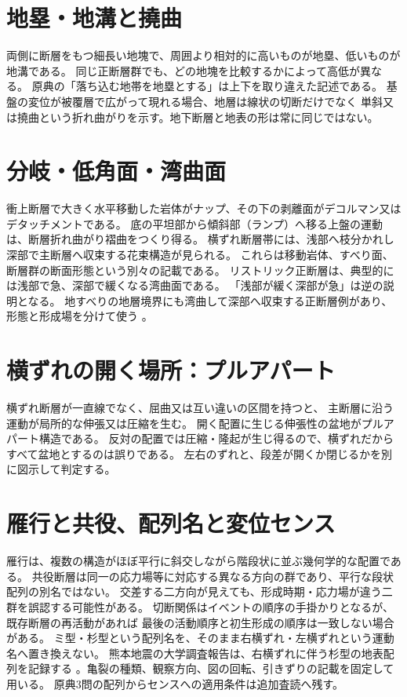 \section{地塁・地溝と撓曲}
\label{theory:structure:horst}
両側に断層をもつ細長い地塊で、周囲より相対的に高いものが地塁、低いものが地溝である。
同じ正断層群でも、どの地塊を比較するかによって高低が異なる。
原典の「落ち込む地帯を地塁とする」は上下を取り違えた記述である。
基盤の変位が被覆層で広がって現れる場合、地層は線状の切断だけでなく
単斜又は撓曲という折れ曲がりを示す。地下断層と地表の形は常に同じではない。

\section{分岐・低角面・湾曲面}
\label{theory:structure:geometry}
衝上断層で大きく水平移動した岩体がナップ、その下の剥離面がデコルマン又はデタッチメントである。
底の平坦部から傾斜部（ランプ）へ移る上盤の運動は、断層折れ曲がり褶曲をつくり得る。
横ずれ断層帯には、浅部へ枝分かれし深部で主断層へ収束する花束構造が見られる。
これらは移動岩体、すべり面、断層群の断面形態という別々の記載である。
リストリック正断層は、典型的には浅部で急、深部で緩くなる湾曲面である。
「浅部が緩く深部が急」は逆の説明となる。
地すべりの地層境界にも湾曲して深部へ収束する正断層例があり、形態と形成場を分けて使う
\cite{str_listric}。

\section{横ずれの開く場所：プルアパート}
\label{theory:structure:pullapart}
横ずれ断層が一直線でなく、屈曲又は互い違いの区間を持つと、
主断層に沿う運動が局所的な伸張又は圧縮を生む。
開く配置に生じる伸張性の盆地がプルアパート構造である。
反対の配置では圧縮・隆起が生じ得るので、横ずれだからすべて盆地とするのは誤りである。
左右のずれと、段差が開くか閉じるかを別に図示して判定する。

\section{雁行と共役、配列名と変位センス}
\label{theory:structure:conjugate}
雁行は、複数の構造がほぼ平行に斜交しながら階段状に並ぶ幾何学的な配置である。
共役断層は同一の応力場等に対応する異なる方向の群であり、平行な段状配列の別名ではない。
交差する二方向が見えても、形成時期・応力場が違う二群を誤認する可能性がある。
切断関係はイベントの順序の手掛かりとなるが、既存断層の再活動があれば
最後の活動順序と初生形成の順序は一致しない場合がある\cite{str_orientation}。
ミ型・杉型という配列名を、そのまま右横ずれ・左横ずれという運動名へ置き換えない。
熊本地震の大学調査報告は、右横ずれに伴う杉型の地表配列を記録する
\cite{str_en2016}。亀裂の種類、観察方向、図の回転、引きずりの記載を固定して用いる。
原典3問の配列からセンスへの適用条件は追加査読へ残す。

